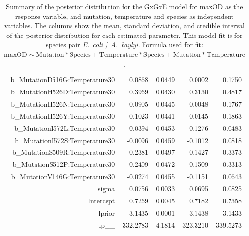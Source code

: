 \begin{table}[ht]
\begin{tabular}{rrrrr}
  b\_MutationD516G:Temperature30 & 0.0868 & 0.0449 & 0.0002 & 0.1750 \\ 
  b\_MutationH526D:Temperature30 & 0.3969 & 0.0430 & 0.3130 & 0.4817 \\ 
  b\_MutationH526N:Temperature30 & 0.0905 & 0.0445 & 0.0048 & 0.1767 \\ 
  b\_MutationH526Y:Temperature30 & 0.1023 & 0.0441 & 0.0145 & 0.1863 \\ 
  b\_MutationI572L:Temperature30 & -0.0394 & 0.0453 & -0.1276 & 0.0483 \\ 
  b\_MutationI572S:Temperature30 & -0.0096 & 0.0459 & -0.1012 & 0.0818 \\ 
  b\_MutationS509R:Temperature30 & 0.2381 & 0.0497 & 0.1427 & 0.3373 \\ 
  b\_MutationS512P:Temperature30 & 0.2409 & 0.0472 & 0.1509 & 0.3313 \\ 
  b\_MutationV146G:Temperature30 & -0.0274 & 0.0455 & -0.1151 & 0.0643 \\ 
  sigma & 0.0756 & 0.0033 & 0.0695 & 0.0825 \\ 
  Intercept & 0.7269 & 0.0045 & 0.7182 & 0.7358 \\ 
  lprior & -3.1435 & 0.0001 & -3.1438 & -3.1433 \\ 
  lp\_\_ & 332.2783 & 4.1814 & 323.3210 & 339.5273 \\ 
   \hline
\end{tabular}
\endgroup
\caption{Summary of the posterior distribution for the GxGxE model for maxOD as the response variable, and mutation, temperature and species as independent variables. The columns show the mean, standard deviation, and credible interval of the posterior distribution for each estimated parameter. This model fit is for species pair \textit{E.~coli} / \textit{A.~baylyi}. Formula used for fit: $\text{maxOD} \sim \text{Mutation} * \text{Species} + \text{Temperature} * \text{Species} + \text{Mutation} * \text{Temperature}$.} 
\label{supptab:GxGxe_no3way_maxOD}
\end{table}
